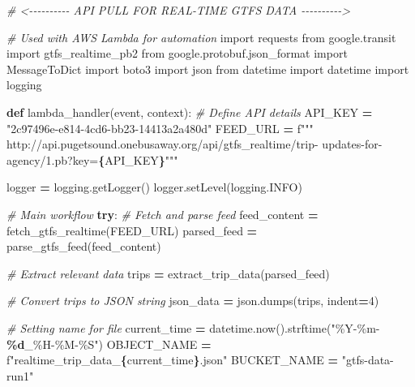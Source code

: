 \documentclass[
  12pt,
]{article}
\newenvironment{Shaded}{\begin{snugshade}}{\end{snugshade}}
\newcommand{\CommentTok}[1]{\textcolor[rgb]{0.56,0.35,0.01}{\textit{#1}}}
\newcommand{\ControlFlowTok}[1]{\textcolor[rgb]{0.13,0.29,0.53}{\textbf{#1}}}
\newcommand{\DecValTok}[1]{\textcolor[rgb]{0.00,0.00,0.81}{#1}}
\newcommand{\ImportTok}[1]{#1}
\newcommand{\KeywordTok}[1]{\textcolor[rgb]{0.13,0.29,0.53}{\textbf{#1}}}
\newcommand{\NormalTok}[1]{#1}
\newcommand{\OperatorTok}[1]{\textcolor[rgb]{0.81,0.36,0.00}{\textbf{#1}}}
\newcommand{\SpecialCharTok}[1]{\textcolor[rgb]{0.81,0.36,0.00}{\textbf{#1}}}
\newcommand{\SpecialStringTok}[1]{\textcolor[rgb]{0.31,0.60,0.02}{#1}}
\newcommand{\StringTok}[1]{\textcolor[rgb]{0.31,0.60,0.02}{#1}}
\begin{document}
\begin{Shaded}
\begin{Highlighting}[]
\CommentTok{\# \textless{}{-}{-}{-}{-}{-}{-}{-}{-}{-}{-} API PULL FOR REAL{-}TIME GTFS DATA {-}{-}{-}{-}{-}{-}{-}{-}{-}{-}\textgreater{}}

\CommentTok{\# Used with AWS Lambda for automation}
\ImportTok{import}\NormalTok{ requests}
\ImportTok{from}\NormalTok{ google.transit }\ImportTok{import}\NormalTok{ gtfs\_realtime\_pb2}
\ImportTok{from}\NormalTok{ google.protobuf.json\_format }\ImportTok{import}\NormalTok{ MessageToDict}
\ImportTok{import}\NormalTok{ boto3}
\ImportTok{import}\NormalTok{ json}
\ImportTok{from}\NormalTok{ datetime }\ImportTok{import}\NormalTok{ datetime}
\ImportTok{import}\NormalTok{ logging}

\KeywordTok{def}\NormalTok{ lambda\_handler(event, context):}
    \CommentTok{\# Define API details}
\NormalTok{    API\_KEY }\OperatorTok{=} \StringTok{"2c97496e{-}e814{-}4cd6{-}bb23{-}14413a2a480d"}
\NormalTok{    FEED\_URL }\OperatorTok{=} \SpecialStringTok{f"""}
\SpecialStringTok{    http://api.pugetsound.onebusaway.org/api/gtfs\_realtime/trip{-}}
\SpecialStringTok{    updates{-}for{-}agency/1.pb?key=}\SpecialCharTok{\{}\NormalTok{API\_KEY}\SpecialCharTok{\}}\SpecialStringTok{"""}
    
\NormalTok{    logger }\OperatorTok{=}\NormalTok{ logging.getLogger()}
\NormalTok{    logger.setLevel(logging.INFO)}

    \CommentTok{\# Main workflow}
    \ControlFlowTok{try}\NormalTok{:}
        \CommentTok{\# Fetch and parse feed}
\NormalTok{        feed\_content }\OperatorTok{=}\NormalTok{ fetch\_gtfs\_realtime(FEED\_URL)}
\NormalTok{        parsed\_feed }\OperatorTok{=}\NormalTok{ parse\_gtfs\_feed(feed\_content)}
        
        \CommentTok{\# Extract relevant data}
\NormalTok{        trips }\OperatorTok{=}\NormalTok{ extract\_trip\_data(parsed\_feed)}
        
        \CommentTok{\# Convert trips to JSON string}
\NormalTok{        json\_data }\OperatorTok{=}\NormalTok{ json.dumps(trips, indent}\OperatorTok{=}\DecValTok{4}\NormalTok{)}

        \CommentTok{\# Setting name for file}
\NormalTok{        current\_time }\OperatorTok{=}\NormalTok{ datetime.now().strftime(}\StringTok{"\%Y{-}\%m{-}}\SpecialCharTok{\%d}\StringTok{\_\%H{-}\%M{-}\%S"}\NormalTok{)}
\NormalTok{        OBJECT\_NAME }\OperatorTok{=} \SpecialStringTok{f"realtime\_trip\_data\_}\SpecialCharTok{\{}\NormalTok{current\_time}\SpecialCharTok{\}}\SpecialStringTok{.json"}
\NormalTok{        BUCKET\_NAME }\OperatorTok{=} \StringTok{"gtfs{-}data{-}run1"}


\end{Highlighting}
\end{Shaded}
\end{document}
